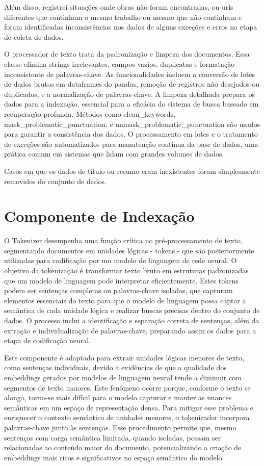 \documentclass[
	12pt,				%
	openright,			%
	oneside,			%
	a4paper,			%
	english,			%
	french,				%
	spanish,			%
	brazil				%
	]{abntex2}
\begin{document}
Além disso, registrei situações onde obras não foram encontradas, ou urls diferentes que continham o mesmo trabalho ou mesmo que não continham  e foram identificadas inconsistências nos dados de alguns exceções e erros na etapa de coleta de dados.

O processador de texto trata da padronização e limpeza dos documentos. Essa classe elimina strings irrelevantes, campos vazios, duplicatas e formatação inconsistente de palavras-chave. As funcionalidades incluem a conversão de lotes de dados brutos em dataframes do pandas, remoção de registros não desejados ou duplicados, e a normalização de palavras-chave. A limpeza detalhada prepara os dados para a indexação, essencial para a eficácia do sistema de busca baseado em recuperação profunda. Métodos como clean\_keywords, mask\_problematic\_punctuation, e unmask\_problematic\_punctuation são usados para garantir a consistência dos dados. O processamento em lotes e o tratamento de exceções são automatizados para manutenção contínua da base de dados, uma prática comum em sistemas que lidam com grandes volumes de dados.

Casos em que os dados de título ou resumo eram inexistentes foram simplesmente removidos do conjunto de dados.

\section{Componente de Indexação}\label{sec:indexacao}

O Tokenizer desempenha uma função crítica no pré-processamento de texto, segmentando documentos em unidades lógicas - tokens - que são posteriormente utilizadas para codificação por um modelo de linguagem de rede neural. O objetivo da tokenização é transformar texto bruto em estruturas padronizadas que um modelo de linguagem pode interpretar eficientemente. Estes tokens podem ser sentenças completas ou palavras-chave isoladas, que capturam elementos essenciais do texto para que o modelo de linguagem possa captar a semântica de cada unidade lógica e realizar buscas precisas dentro do conjunto de dados. O processo inclui a identificação e separação correta de sentenças, além da extração e individualização de palavras-chave, preparando assim os dados para a etapa de codificação neural.

Este componente é adaptado para extrair unidades lógicas menores de texto, como sentenças individuais, devido a evidências de que a qualidade dos embeddings gerados por modelos de linguagem neural tende a diminuir com segmentos de texto maiores. Este fenômeno ocorre porque, conforme o texto se alonga, torna-se mais difícil para o modelo capturar e manter as nuances semânticas em um espaço de representação densa. Para mitigar esse problema e enriquecer o contexto semântico de unidades menores, o tokenizador incorpora palavras-chave junto às sentenças. Esse procedimento permite que, mesmo sentenças com carga semântica limitada, quando isoladas, possam ser relacionadas ao conteúdo maior do documento, potencializando a criação de embeddings mais ricos e significativos no espaço semântico do modelo.
\end{document}
